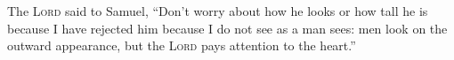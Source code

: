 
\begin{inparaenum}
     The \textsc{Lord} said to Samuel, ``Don't worry about how he looks or how tall he is because I have rejected him because I do not see as a man sees: men look on the outward appearance, but the \textsc{Lord} pays attention to the heart.''%
\end{inparaenum}
